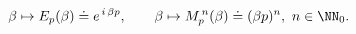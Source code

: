 \begin{equation} \label{obsdef}
\beta \mapsto E_p(\beta) \doteq e^{\, i \, \beta p}, \quad \quad
\beta \mapsto M_p^{\, n}(\beta) \doteq (\beta p)^n, \ n \in \NN_0.
\end{equation}

